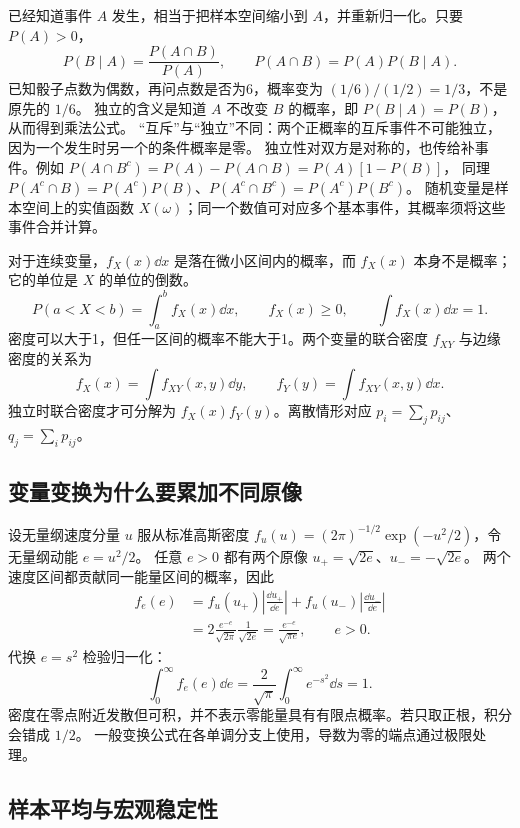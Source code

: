 已经知道事件 $A$ 发生，相当于把样本空间缩小到 $A$，并重新归一化。只要 $P(A)>0$，
\begin{equation}
 P(B\mid A)=\frac{P(A\cap B)}{P(A)},\qquad
 P(A\cap B)=P(A)P(B\mid A).
\end{equation}
已知骰子点数为偶数，再问点数是否为6，概率变为 $(1/6)/(1/2)=1/3$，不是原先的 $1/6$。
独立的含义是知道 $A$ 不改变 $B$ 的概率，即 $P(B\mid A)=P(B)$，从而得到乘法公式。
“互斥”与“独立”不同：两个正概率的互斥事件不可能独立，因为一个发生时另一个的条件概率是零。
独立性对双方是对称的，也传给补事件。例如
$P(A\cap B^c)=P(A)-P(A\cap B)=P(A)[1-P(B)]$，
同理 $P(A^c\cap B)=P(A^c)P(B)$、$P(A^c\cap B^c)=P(A^c)P(B^c)$。
随机变量是样本空间上的实值函数 $X(\omega)$；同一个数值可对应多个基本事件，其概率须将这些事件合并计算。

对于连续变量，$f_X(x)\dd x$ 是落在微小区间内的概率，而 $f_X(x)$ 本身不是概率；它的单位是 $X$ 的单位的倒数。
\[P(a<X<b)=\int_a^bf_X(x)\dd x,\qquad
f_X(x)\ge0,\qquad\int f_X(x)\dd x=1.\]
密度可以大于1，但任一区间的概率不能大于1。两个变量的联合密度 $f_{XY}$ 与边缘密度的关系为
\[f_X(x)=\int f_{XY}(x,y)\dd y,\qquad
f_Y(y)=\int f_{XY}(x,y)\dd x.\]
独立时联合密度才可分解为 $f_X(x)f_Y(y)$。离散情形对应 $p_i=\sum_jp_{ij}$、$q_j=\sum_ip_{ij}$。

\subsection{变量变换为什么要累加不同原像}

设无量纲速度分量 $u$ 服从标准高斯密度
$f_u(u)=(2\pi)^{-1/2}\exp(-u^2/2)$，令无量纲动能 $e=u^2/2$。
任意 $e>0$ 都有两个原像 $u_+=\sqrt{2e}$、$u_-=-\sqrt{2e}$。
两个速度区间都贡献同一能量区间的概率，因此
\begin{align*}
 f_e(e)&=f_u(u_+)\left|\frac{\dd u_+}{\dd e}\right|
       +f_u(u_-)\left|\frac{\dd u_-}{\dd e}\right|\\
 &=2\frac{e^{-e}}{\sqrt{2\pi}}\frac1{\sqrt{2e}}
 =\frac{e^{-e}}{\sqrt{\pi e}},\qquad e>0.
\end{align*}
代换 $e=s^2$ 检验归一化：
\[\int_0^\infty f_e(e)\dd e
=\frac2{\sqrt\pi}\int_0^\infty e^{-s^2}\dd s=1.\]
密度在零点附近发散但可积，并不表示零能量具有有限点概率。若只取正根，积分会错成 $1/2$。
一般变换公式在各单调分支上使用，导数为零的端点通过极限处理。

\subsection{样本平均与宏观稳定性}

